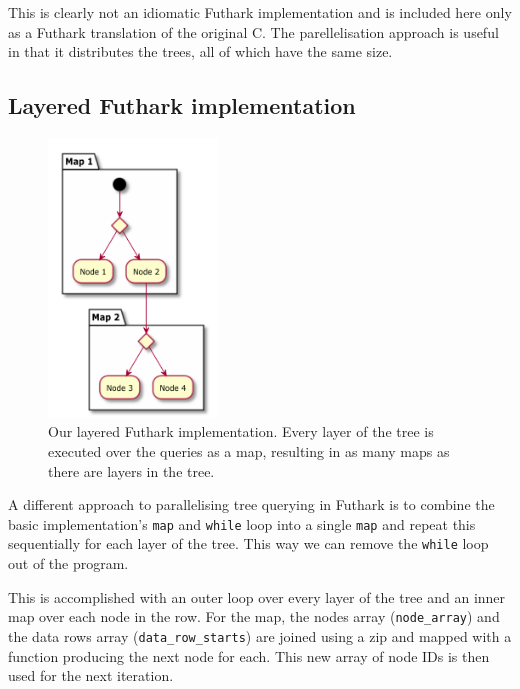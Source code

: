 \documentclass[a4paper]{article}
\begin{document}
This is clearly not an idiomatic Futhark implementation and is included here only as a Futhark translation of the original C. The parellelisation approach is useful in that it distributes the trees, all of which have the same size.

\subsection{Layered Futhark implementation}

\begin{figure}
\centering
\includegraphics[width=0.4\textwidth]{tree_flat}
\caption{\label{fig:frog3}Our layered Futhark implementation. Every layer of the tree is executed over the queries as a map, resulting in as many maps as there are layers in the tree.}
\end{figure}

A different approach to parallelising tree querying in Futhark is to combine the basic implementation's \texttt{map} and \texttt{while} loop into a single \texttt{map} and repeat this sequentially for each layer of the tree. This way we can remove the \texttt{while} loop out of the program.

This is accomplished with an outer loop over every layer of the tree and an inner map over each node in the row. For the map, the nodes array (\texttt{node\_array}) and the data rows array (\texttt{data\_row\_starts}) are joined using a zip and mapped with a function producing the next node for each. This new array of node IDs is then used for the next iteration.
\end{document}
